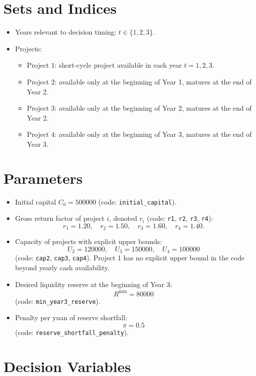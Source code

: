 \section*{Sets and Indices}

\begin{itemize}
    \item Years relevant to decision timing: $t \in \{1,2,3\}$.
    \item Projects:
    \begin{itemize}
        \item Project $1$: short-cycle project available in each year $t=1,2,3$.
        \item Project $2$: available only at the beginning of Year 1, matures at the end of Year 2.
        \item Project $3$: available only at the beginning of Year 2, matures at the end of Year 2.
        \item Project $4$: available only at the beginning of Year 3, matures at the end of Year 3.
    \end{itemize}
\end{itemize}

\section*{Parameters}

\begin{itemize}
    \item Initial capital $C_0 = 500000$ (code: \texttt{initial\_capital}).
    \item Gross return factor of project $i$, denoted $r_i$ (code: \texttt{r1}, \texttt{r2}, \texttt{r3}, \texttt{r4}):
    \[
    r_1 = 1.20,\quad r_2 = 1.50,\quad r_3 = 1.60,\quad r_4 = 1.40.
    \]
    \item Capacity of projects with explicit upper bounds:
    \[
    U_2 = 120000,\quad U_3 = 150000,\quad U_4 = 100000
    \]
    (code: \texttt{cap2}, \texttt{cap3}, \texttt{cap4}).
    Project 1 has no explicit upper bound in the code beyond yearly cash availability.
    \item Desired liquidity reserve at the beginning of Year 3:
    \[
    R^{\min}=80000
    \]
    (code: \texttt{min\_year3\_reserve}).
    \item Penalty per yuan of reserve shortfall:
    \[
    \pi = 0.5
    \]
    (code: \texttt{reserve\_shortfall\_penalty}).
\end{itemize}

\section*{Decision Variables}

